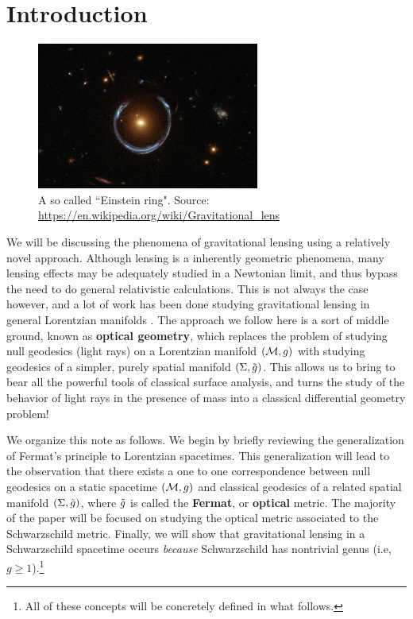 
\section{Introduction}

\begin{figure}[!htb]
	\centering
	\includegraphics[width=0.65\textwidth]{img/einstein-ring.png}
	\caption{A so called ``Einstein ring". Source: \url{https://en.wikipedia.org/wiki/Gravitational_lens}}
	\label{}
\end{figure}

We will be discussing the phenomena of gravitational lensing using a relatively novel approach.
Although lensing is a inherently geometric phenomena, many lensing effects may be adequately studied in a Newtonian limit, and thus bypass the need to do general relativistic calculations.
This is not always the case however, and a lot of work has been done studying gravitational lensing in general Lorentzian manifolds \cite{1992grle.book.....S}.
The approach we follow here is a sort of middle ground, known as \textbf{optical geometry}, which replaces the problem of studying null geodesics (light rays) on a Lorentzian manifold $(\mathcal{M}, g)$ with studying geodesics of a simpler, purely spatial manifold $(\Sigma, \tilde{g})$.
This allows us to bring to bear all the powerful tools of classical surface analysis, and turns the study of the behavior of light rays in the presence of mass into a classical differential geometry problem!

We organize this note as follows.
We begin by briefly reviewing the generalization of Fermat's principle to Lorentzian spacetimes.
This generalization will lead to the observation that there exists a one to one correspondence between null geodesics on a static spacetime $(\mathcal{M}, g)$ and classical geodesics of a related spatial manifold $(\Sigma, \tilde{g})$, where $\tilde{g}$ is called the \textbf{Fermat}, or \textbf{optical} metric.
The majority of the paper will be focused on studying the optical metric associated to the Schwarzschild metric.
Finally, we will show that gravitational lensing in a Schwarzschild spacetime occurs \textit{because} Schwarzschild has nontrivial genus (i.e, $g \ge 1$).\footnote{All of these concepts will be concretely defined in what follows.}

